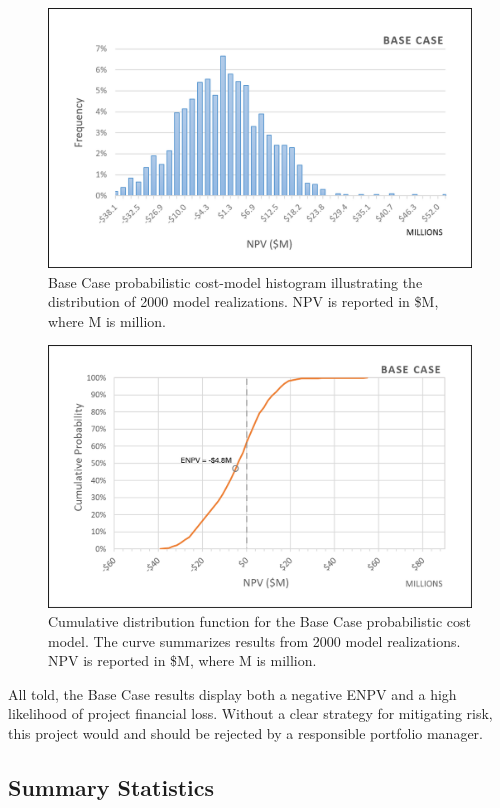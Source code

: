 \begin{figure}[!htp]
\centering
\includegraphics[width=.85\textwidth]{templates/images/Figure-Base_Case_Histogram.png}
\caption[Base Case histogram]{Base Case probabilistic cost-model histogram illustrating the distribution of 2000 model realizations. NPV is reported in \$M, where M is million.}
\label{fig:base_case_hist}
\end{figure}

\begin{figure}[!htp]
\centering
\includegraphics[width=.85\textwidth]{templates/images/Figure-Base_Case_CDF.png}
\caption[Base Case CDF]{Cumulative distribution function for the Base Case probabilistic cost model. The curve summarizes results from 2000 model realizations. NPV is reported in \$M, where M is million.}
\label{fig:base_case_cdf}
\end{figure}

All told, the Base Case results display both a negative ENPV and a high likelihood of project financial loss. Without a clear strategy for mitigating risk, this project would and should be rejected by a responsible portfolio manager.
\pagebreak
\subsection{Summary Statistics}\label{ch6:base_stats}

